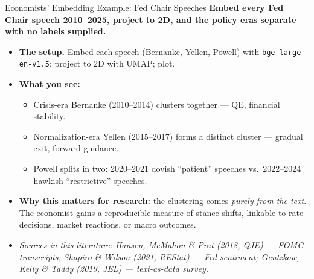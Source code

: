 \begin{frame}{Economists' Embedding Example: Fed Chair Speeches}
\textbf{Embed every Fed Chair speech 2010--2025, project to 2D, and the policy eras separate --- with no labels supplied.}

\medskip
\begin{itemize}
\item \textbf{The setup.} Embed each speech (Bernanke, Yellen, Powell) with \texttt{bge-large-en-v1.5}; project to 2D with UMAP; plot.

\medskip
\item \textbf{What you see:}
\begin{itemize}
    \item Crisis-era Bernanke (2010--2014) clusters together --- QE, financial stability.
    \item Normalization-era Yellen (2015--2017) forms a distinct cluster --- gradual exit, forward guidance.
    \item Powell splits in two: 2020--2021 dovish ``patient'' speeches vs.\ 2022--2024 hawkish ``restrictive'' speeches.
\end{itemize}

\medskip
\item \textbf{Why this matters for research:} the clustering comes \emph{purely from the text}. The economist gains a reproducible measure of stance shifts, linkable to rate decisions, market reactions, or macro outcomes.

\medskip
\item \textit{\footnotesize Sources in this literature: Hansen, McMahon \& Prat (2018, QJE) --- FOMC transcripts; Shapiro \& Wilson (2021, REStat) --- Fed sentiment; Gentzkow, Kelly \& Taddy (2019, JEL) --- text-as-data survey.}
\end{itemize}
\end{frame}

